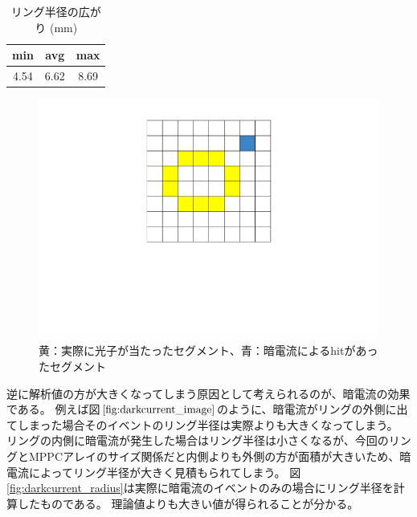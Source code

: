 \documentclass[uplatex, titlepage, dvipdfmx, 12pt, a4paper]{jsreport}
\begin{document}
    \begin{table}[hbtp]
      \begin{center}
        \label{tab:radius}
        \caption{リング半径の広がり (mm)}
        \begin{tabular}{|c|c|c|}\hline
          min & avg & max\\ \hline
          4.54 & 6.62 & 8.69\\ \hline
        \end{tabular}
      \end{center}
    \end{table}
    \begin{figure}[hbtp]
        \begin{center} 
          \includegraphics[scale=0.4, clip]{image/dark_current_image.pdf}
          \caption{黄：実際に光子が当たったセグメント、青：暗電流によるhitがあったセグメント} 
          \label{fig:darkcurrent_image} 
        \end{center}
      \end{figure}
      逆に解析値の方が大きくなってしまう原因として考えられるのが、暗電流の効果である。
      例えば図$\ref{fig:darkcurrent_image}$のように、暗電流がリングの外側に出てしまった場合そのイベントのリング半径は実際よりも大きくなってしまう。
      リングの内側に暗電流が発生した場合はリング半径は小さくなるが、今回のリングとMPPCアレイのサイズ関係だと内側よりも外側の方が面積が大きいため、暗電流によってリング半径が大きく見積もられてしまう。
      図\ref{fig:darkcurrent_radius}は実際に暗電流のイベントのみの場合にリング半径を計算したものである。
      理論値よりも大きい値が得られることが分かる。
\end{document}
